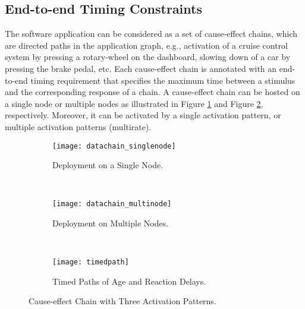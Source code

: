 \subsection{End-to-end Timing Constraints}
The software application can be considered as a set of cause-effect chains, which are directed paths in the application graph, e.g.,  activation of a cruise control system by pressing a rotary-wheel on the dashboard, slowing down of a car by pressing the brake pedal, etc. Each cause-effect chain is annotated with an end-to-end timing requirement that specifies the maximum time between a stimulus and the corresponding response of a chain. A cause-effect chain can be hosted on a single node or multiple nodes as illustrated in Figure \ref{fig_datachainsingle} and Figure \ref{fig_datachainmulti}, respectively. Moreover, it can be activated by a single activation pattern, or multiple activation patterns (multirate).
\begin{figure*}[h!]
    \centering
    \begin{subfigure}[b]{0.25\textwidth}
    \texttt{[image: datachain\_singlenode]}
    \caption{Deployment on a Single Node.}
    \label{fig_datachainsingle}
    \end{subfigure}
    ~ %
    \begin{subfigure}[b]{0.365\textwidth}
    \texttt{[image: datachain\_multinode]}
    \caption{Deployment on Multiple Nodes.}
    \label{fig_datachainmulti}
    \end{subfigure}
   ~\vspace{-0.2cm}
    \begin{subfigure}[b]{0.35\textwidth}
    \texttt{[image: timedpath]}
    \caption{Timed Paths of Age and Reaction Delays.}
    \label{fig_timedpath}
    \end{subfigure}
    \caption{Cause-effect Chain with Three Activation Patterns.}
    \label{fig:datachain}
\end{figure*}

